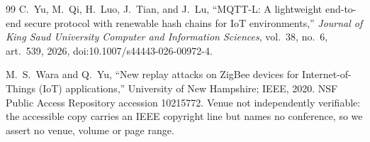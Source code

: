 \begin{thebibliography}{99}
 C.~Yu, M.~Qi, H.~Luo, J.~Tian, and J.~Lu, ``MQTT-L: A lightweight
end-to-end secure protocol with renewable hash chains for IoT environments,'' \emph{Journal of
King Saud University Computer and Information Sciences}, vol.~38, no.~6, art.~539, 2026,
doi:10.1007/s44443-026-00972-4.

 M.~S.~Wara and Q.~Yu, ``New replay attacks on ZigBee devices for
Internet-of-Things (IoT) applications,'' University of New Hampshire; IEEE, 2020. NSF Public
Access Repository accession 10215772. Venue not independently verifiable: the accessible copy
carries an IEEE copyright line but names no conference, so we assert no venue, volume or page
range.

\end{thebibliography}


